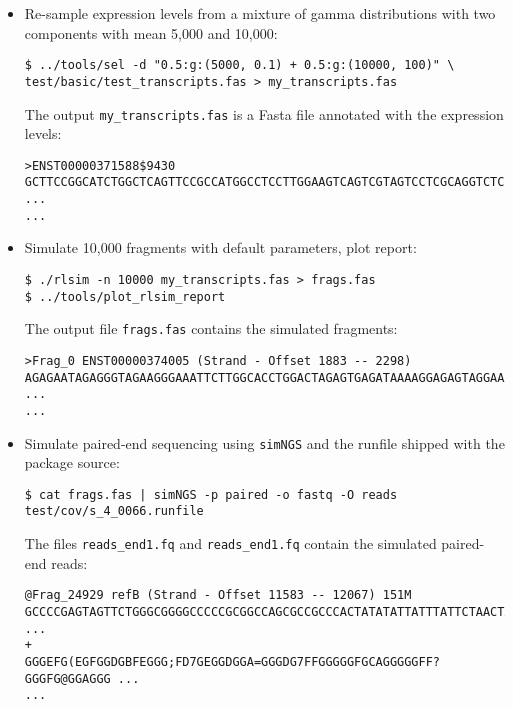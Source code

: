 \begin{itemize}
\item{Re-sample expression levels from a mixture of gamma distributions with two components with mean 5,000 and 10,000:

\begin{verbatim}
$ ../tools/sel -d "0.5:g:(5000, 0.1) + 0.5:g:(10000, 100)" \
test/basic/test_transcripts.fas > my_transcripts.fas
\end{verbatim}

The output {\tt my\_transcripts.fas} is a Fasta file annotated with the expression levels:

\begin{verbatim}
>ENST00000371588$9430
GCTTCCGGCATCTGGCTCAGTTCCGCCATGGCCTCCTTGGAAGTCAGTCGTAGTCCTCGCAGGTCTCGGCGGGAGCTG ...
...
\end{verbatim}

}
\item{Simulate 10,000 fragments with default parameters, plot \rlsim report:

\begin{verbatim}
$ ./rlsim -n 10000 my_transcripts.fas > frags.fas
$ ../tools/plot_rlsim_report
\end{verbatim}

The output file {\tt frags.fas} contains the simulated fragments:

\begin{verbatim}
>Frag_0 ENST00000374005 (Strand - Offset 1883 -- 2298)
AGAGAATAGAGGGTAGAAGGGAAATTCTTGGCACCTGGACTAGAGTGAGATAAAAGGAGAGTAGGAAAGCAGTGA ...
...
\end{verbatim}

}
\item{Simulate paired-end sequencing using {\tt simNGS} \cite{simngs} and the runfile shipped with the package source:

\begin{verbatim}
$ cat frags.fas | simNGS -p paired -o fastq -O reads test/cov/s_4_0066.runfile
\end{verbatim}

The files {\tt reads\_end1.fq} and {\tt reads\_end1.fq} contain the simulated paired-end reads:

\begin{verbatim}
@Frag_24929 refB (Strand - Offset 11583 -- 12067) 151M
GCCCCGAGTAGTTCTGGGCGGGGCCCCCGCGGCCAGCGCCGCCCACTATATATTATTTATTCTAACTATT ...
+
GGGEFG(EGFGGDGBFEGGG;FD7GEGGDGGA=GGGDG7FFGGGGGFGCAGGGGGFF?GGGFG@GGAGGG ...
...
\end{verbatim}

}
\end{itemize}
